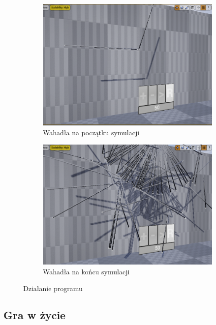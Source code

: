 \documentclass[a4paper,12pt,reqno]{article}
\begin{document}
\begin{figure}[H]%
	\centering
	\begin{subfigure}{.5\textwidth}
		\centering
		\includegraphics[width=0.8\linewidth]{graphics/pendulum/PendulumInUE_1.png}
		\caption{Wahadła na początku symulacji}	
		\label{ref:subref_a}
	\end{subfigure}%
	\begin{subfigure}{.5\textwidth}
		\centering
		\includegraphics[width=0.8\linewidth]{graphics/pendulum/PendulumInUE_2.png}
		\caption{Wahadła na końcu symulacji}
		\label{ref:subref_b}
	\end{subfigure}%
	

\caption{Działanie programu}
\label{ref:ref}
\end{figure}

\subsection{Gra w życie}
\end{document}
